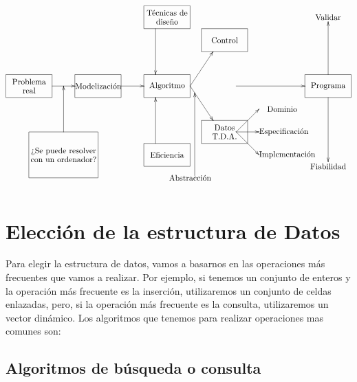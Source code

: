 \documentclass[10pt,a4paper,spanish]{report}
\begin{document}
            \[\begin{xy}
            ,(0,0)*+=<10mm>[F]\txt<2cm>{Problema\\real}
            ,(30,0)*+=<10mm>[F]\txt<2cm>{Modelización}
            ,(15,-30)*+=<20mm>[F]\txt<3cm>{¿Se puede resolver con un ordenador?}
            ,(60,0)*+=<10mm>[F]\txt<2cm>{Algoritmo}
            ,(60,-30)*+=<10mm>[F]\txt<2cm>{Eficiencia}
            ,(60,30)*+=<10mm>[F]\txt<2cm>{Técnicas de\\diseño}
            ,(85,20)*+=<10mm>[F]\txt<2cm>{Control}
            ,(85,-20)*+=<10mm>[F]\txt<2cm>{Datos\\T.D.A.}
            ,(70,-40)*+=<10mm>[]\txt<2cm>{Abstracción}
            ,(110,-10)*+=<10mm>[]\txt<2cm>{Dominio}
            ,(110,-20)*+=<10mm>[]\txt<2cm>{Especificación}
            ,(110,-30)*+=<10mm>[]\txt<2cm>{Implementación}
            ,(130,0)*+=<10mm>[F]\txt<2cm>{Programa}
            ,(130,30)*+=<10mm>[]\txt<2cm>{Validar}
            ,(130,-35)*+=<10mm>[]\txt<2cm>{Fiabilidad}

            \ar@{->} (10,0);(20,0)
            \ar@{->} (15,-20);(15,0)
            \ar@{->} (40,0);(50,0)
            \ar@{->} (55,-25);(55,-5)
            \ar@{->} (55,25);(55,5)
            \ar@{->} (70,0);(80,15)
            \ar@{->} (70,0);(80,-15)
            \ar@{->} (72,-39);(72,-3)
            \ar@{->} (90,-20);(100,-10)
            \ar@{->} (90,-20);(100,-20)
            \ar@{->} (90,-20);(100,-30)
            \ar@{->} (90,0);(120,0)
            \ar@{->} (130,5);(130,28)
            \ar@{->} (130,-5);(130,-33)
            \end{xy}\]

      \section{\textcolor[rgb]{0.5,0.8,0.1}Elección de la estructura de Datos}
      \noindent
            Para elegir la estructura de datos, vamos a basarnos en las operaciones más frecuentes que vamos a realizar. Por ejemplo, si tenemos un conjunto de enteros y la operación más frecuente es la inserción, utilizaremos un conjunto de celdas enlazadas, pero, si la operación más frecuente es la consulta, utilizaremos un vector dinámico.
            \noindent
            Los algoritmos que tenemos para realizar operaciones mas comunes son:
            \subsection{\textcolor[rgb]{0.5,0.8,0.1}Algoritmos de búsqueda o consulta}
\end{document}
